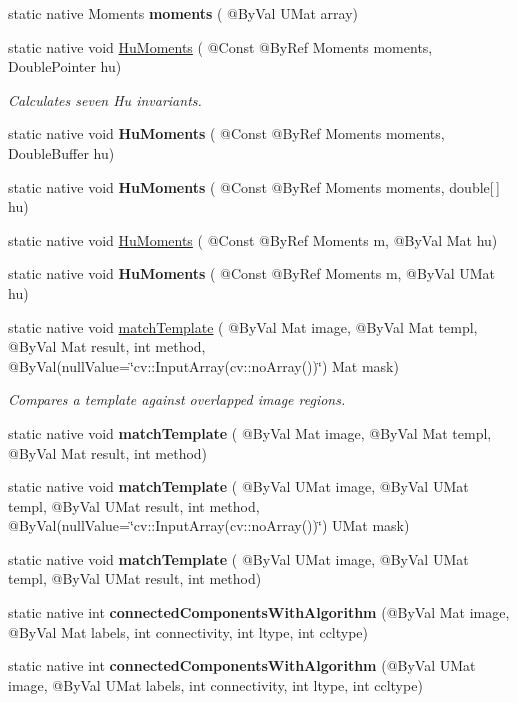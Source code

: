 \begin{DoxyCompactItemize}
static native Moments {\bfseries moments} ( @By\+Val U\+Mat array)
\item 
static native void \hyperlink{group__imgproc__shape_ga352b5f00f51966f12301dfd255d06189}{Hu\+Moments} ( @Const @By\+Ref Moments moments, Double\+Pointer hu)
\begin{DoxyCompactList}\small\item\em Calculates seven Hu invariants. \end{DoxyCompactList}\item 
static native void {\bfseries Hu\+Moments} ( @Const @By\+Ref Moments moments, Double\+Buffer hu)
\item 
static native void {\bfseries Hu\+Moments} ( @Const @By\+Ref Moments moments, double\mbox{[}$\,$\mbox{]} hu)
\item 
static native void \hyperlink{group__imgproc__shape_gab567ad055b6ac17d75b8f78044f7c2d4}{Hu\+Moments} ( @Const @By\+Ref Moments m, @By\+Val Mat hu)
\item 
static native void {\bfseries Hu\+Moments} ( @Const @By\+Ref Moments m, @By\+Val U\+Mat hu)
\item 
static native void \hyperlink{group__imgproc__object_ga9a21de5c468f2b954413017382a99d29}{match\+Template} ( @By\+Val Mat image, @By\+Val Mat templ, @By\+Val Mat result, int method, @By\+Val(null\+Value=\char`\"{}cv\+::\+Input\+Array(cv\+::no\+Array())\char`\"{}) Mat mask)
\begin{DoxyCompactList}\small\item\em Compares a template against overlapped image regions. \end{DoxyCompactList}\item 
static native void {\bfseries match\+Template} ( @By\+Val Mat image, @By\+Val Mat templ, @By\+Val Mat result, int method)
\item 
static native void {\bfseries match\+Template} ( @By\+Val U\+Mat image, @By\+Val U\+Mat templ, @By\+Val U\+Mat result, int method, @By\+Val(null\+Value=\char`\"{}cv\+::\+Input\+Array(cv\+::no\+Array())\char`\"{}) U\+Mat mask)
\item 
static native void {\bfseries match\+Template} ( @By\+Val U\+Mat image, @By\+Val U\+Mat templ, @By\+Val U\+Mat result, int method)
\item 
static native int {\bfseries connected\+Components\+With\+Algorithm} (@By\+Val Mat image, @By\+Val Mat labels, int connectivity, int ltype, int ccltype)
\item 
static native int {\bfseries connected\+Components\+With\+Algorithm} (@By\+Val U\+Mat image, @By\+Val U\+Mat labels, int connectivity, int ltype, int ccltype)

\end{DoxyCompactItemize}
